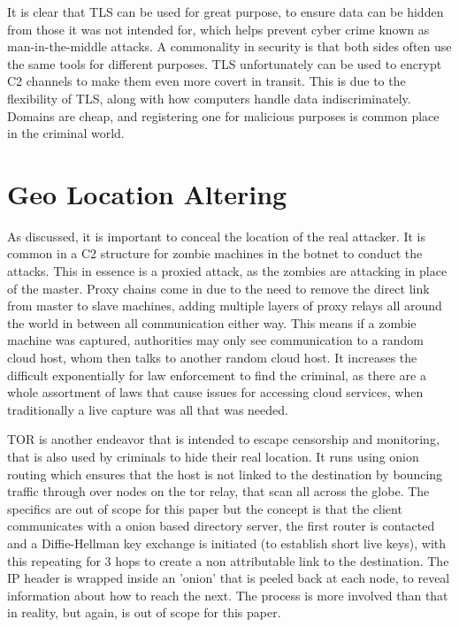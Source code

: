 It is clear that TLS can be used for great purpose, to ensure data can be hidden from those it was not intended for, which helps prevent cyber crime known as man-in-the-middle attacks. A commonality in security is that both sides often use the same tools for different purposes. TLS unfortunately can be used to encrypt C2 
channels to make them even more covert in transit. This is due to the flexibility of TLS, along with how computers handle data indiscriminately. Domains are cheap, and registering one for malicious purposes is common place in the criminal world. \citep{TLS}


\section{Geo Location Altering}
As discussed, it is important to conceal the location of the real attacker. It is common in a C2 structure for zombie machines in the botnet to conduct the attacks. This in essence is a proxied attack,
as the zombies are attacking in place of the master. Proxy chains come in due to the need to remove the direct link from master to slave machines, adding multiple layers of proxy relays all around the world 
in between all communication either way. This means if a zombie machine was captured, authorities may only see communication to a random cloud host, whom then talks to another random cloud host. It increases the
difficult exponentially for law enforcement to find the criminal, as there are a whole assortment of laws that cause issues for accessing cloud services, when traditionally a live capture was all that was needed. 


TOR is another endeavor that is intended to escape censorship and monitoring, that is also used by criminals to hide their real location. It runs using onion routing which ensures that the host is not linked to the destination by
bouncing traffic through over nodes on the tor relay, that scan all across the globe. The specifics are out of scope for this paper but the concept is that the client communicates with a onion based directory server, the first router is
contacted and a Diffie-Hellman key exchange is initiated (to establish short live keys), with this repeating for 3 hops to create a non attributable link to the destination. The IP header is wrapped inside an 'onion' that is peeled back at each node, to reveal information about how to reach the next.
The process is more involved than that in reality, but again, is out of scope for this paper. \citep{TorMalware}

